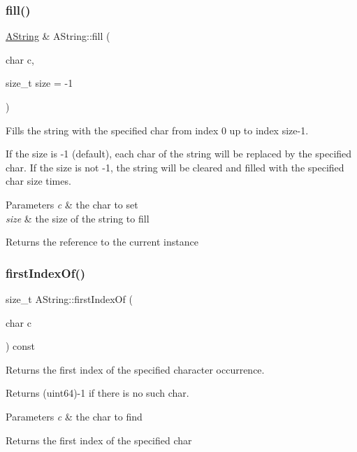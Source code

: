 \subsubsection{\texorpdfstring{fill()}{fill()}}
{\footnotesize\ttfamily \mbox{\hyperlink{class_a_string}{A\+String}} \& A\+String\+::fill (\begin{DoxyParamCaption}\item[{char}]{c,  }\item[{size\+\_\+t}]{size = {\ttfamily -\/1} }\end{DoxyParamCaption})}



Fills the string with the specified char from index 0 up to index size-\/1. 

If the size is -\/1 (default), each char of the string will be replaced by the specified char. If the size is not -\/1, the string will be cleared and filled with the specified char size times.


\begin{DoxyParams}{Parameters}
{\em c} & the char to set \\
\hline
{\em size} & the size of the string to fill \\
\hline
\end{DoxyParams}
\begin{DoxyReturn}{Returns}
the reference to the current instance 
\end{DoxyReturn}
\mbox{\label{class_a_string_a8b92a3ca206d9a1a091c8e0609d39c0b}} 
\subsubsection{\texorpdfstring{firstIndexOf()}{firstIndexOf()}}
{\footnotesize\ttfamily size\+\_\+t A\+String\+::first\+Index\+Of (\begin{DoxyParamCaption}\item[{char}]{c }\end{DoxyParamCaption}) const}



Returns the first index of the specified character occurrence. 

Returns (uint64)-\/1 if there is no such char.


\begin{DoxyParams}{Parameters}
{\em c} & the char to find \\
\hline
\end{DoxyParams}
\begin{DoxyReturn}{Returns}
the first index of the specified char 
\end{DoxyReturn}
\mbox{\label{class_a_string_a28ba997ce8f0acc4d05cc567bdfce6d0}} 
